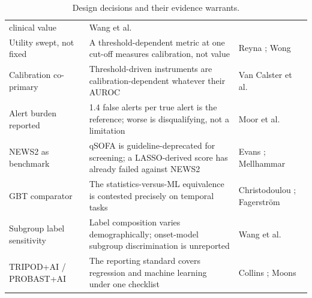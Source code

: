 \begin{table}[H]
\begin{tabular}{p{3.1cm}p{5.6cm}p{4cm}}
        clinical value &
        Wang et al.\ \cite{wang2025srpm} \\
        Utility swept, not fixed & A threshold-dependent metric at one cut-off
        measures calibration, not value &
        Reyna \cite{reyna2020utility};
        Wong \cite{wong2026epic} \\
        Calibration co-primary & Threshold-driven instruments are
        calibration-dependent whatever their AUROC &
        Van Calster et al.\ \cite{vancalster2019calibration} \\
        Alert burden reported & 1.4 false alerts per true alert is the
        reference; worse is disqualifying, not a limitation &
        Moor et al.\ \cite{moor2023review} \\
        NEWS2 as benchmark & qSOFA is guideline-deprecated for screening; a
        LASSO-derived score has already failed against NEWS2 &
        Evans \cite{evans2021ssc};
        Mellhammar \cite{mellhammar2020news2} \\
        GBT comparator & The statistics-versus-ML equivalence is contested
        precisely on temporal tasks &
        Christodoulou \cite{christodoulou2019cox};
        Fagerstr{\"o}m \cite{fagerstrom2019lisep} \\
        Subgroup label sensitivity & Label composition varies demographically;
        onset-model subgroup discrimination is unreported &
        Wang et al.\ \cite{wang2022equity} \\
        TRIPOD+AI / PROBAST+AI & The reporting standard covers regression and
        machine learning under one checklist &
        Collins \cite{collins2024tripodai};
        Moons \cite{moons2025probastai} \\
        \bottomrule
    \end{tabular}
    \caption{Design decisions and their evidence warrants.}
    \label{tab:design_warrant}
\end{table}
